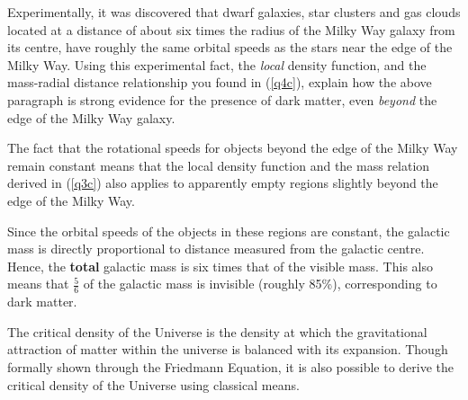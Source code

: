 \documentclass[a4paper,11pt,draft]{exam}
\begin{document}
\begin{questions}
{	Experimentally, it was discovered that dwarf galaxies, star clusters and gas clouds located at a distance of about six times the radius of the Milky Way galaxy from its centre, have roughly the same orbital speeds as the stars near the edge of the Milky Way. }
\question[3]
	\vspace*{-10pt}
	Using this experimental fact, the \textit{local} density function, and the mass-radial distance relationship you found in (\ref{q4c}), explain how the above paragraph is strong evidence for the presence of dark matter, even \textit{beyond} the edge of the Milky Way galaxy.
	\droppoints
	\begin{solution}
		The fact that the rotational speeds for objects beyond the edge of the Milky Way remain constant
		means that the local density function and the mass relation derived in (\ref{q3c}) also applies to apparently empty regions slightly beyond the edge of the Milky Way. 
		
		Since the orbital speeds of the objects in these regions are constant, the galactic mass is directly proportional to distance measured from the galactic centre. Hence, the \textbf{total} galactic mass is six times that of the visible mass. This also means that $ \frac{5}{6} $ of the galactic mass is invisible (roughly 85\%), corresponding to dark matter.
	\end{solution}

\question
	The critical density of the Universe is the density at which the gravitational attraction of matter
	within the universe is balanced with its expansion. Though formally shown through the Friedmann
	Equation, it is also possible to derive the critical density of the Universe using classical means. 
	

\end{questions}
\end{document}
